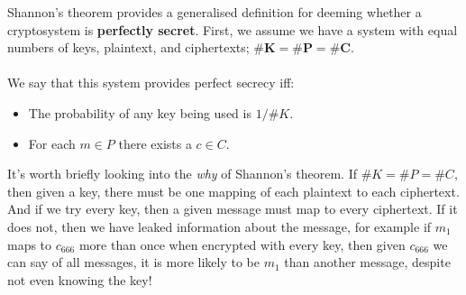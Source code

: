 	Shannon's theorem provides a generalised definition for deeming whether a cryptosystem is \textbf{perfectly secret}. First, we assume we have a system with equal numbers of keys, plaintext, and ciphertexts; $\mathbf{\#K = \#P = \#C}$.\\
	\\
	We say that this system provides perfect secrecy iff:
	\begin{itemize}
		\item The probability of any key being used is $1/\#K$.
		\item For each $m \in P$ there exists a $c \in C$.
	\end{itemize}
	It's worth briefly looking into the \textit{why} of Shannon's theorem. If $\#K = \#P = \#C$, then given a key, there must be one mapping of each plaintext to each ciphertext. And if we try every key, then a given message must map to every ciphertext. If it does not, then we have leaked information about the message, for example if $m_1$ maps to $c_{666}$ more than once when encrypted with every key, then given $c_{666}$ we can say of all messages, it is more likely to be $m_1$ than another message, despite not even knowing the key!